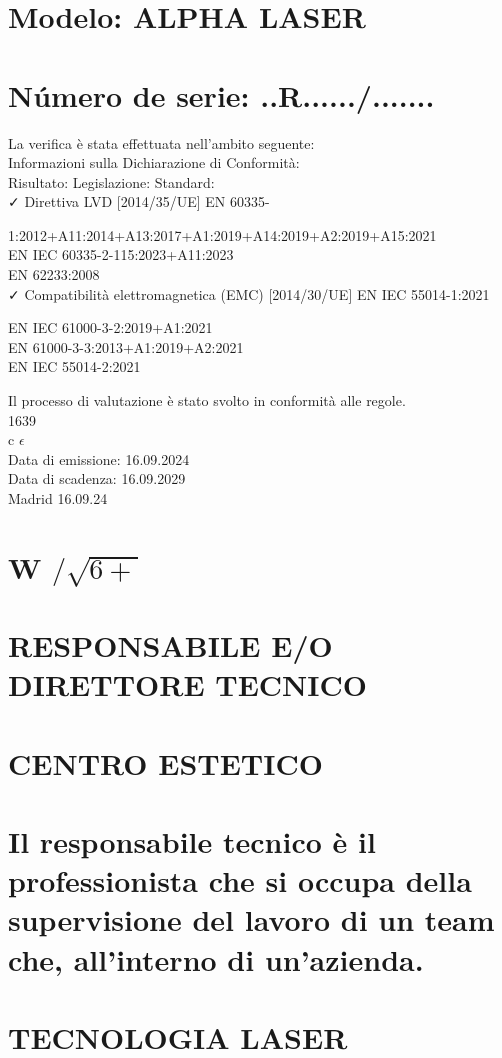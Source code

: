 \documentclass[10pt]{article}
\begin{document}
\section{Modelo: ALPHA LASER}
\section{Número de serie: ..R....../.......}
La verifica è stata effettuata nell'ambito seguente:\\
Informazioni sulla Dichiarazione di Conformità:\\
Risultato: Legislazione: Standard:\\[0pt]
✓ Direttiva LVD [2014/35/UE] EN 60335-

1:2012+A11:2014+A13:2017+A1:2019+A14:2019+A2:2019+A15:2021\\
EN IEC 60335-2-115:2023+A11:2023\\
EN 62233:2008\\[0pt]
✓ Compatibilità elettromagnetica (EMC) [2014/30/UE] EN IEC 55014-1:2021

EN IEC 61000-3-2:2019+A1:2021\\
EN 61000-3-3:2013+A1:2019+A2:2021\\
EN IEC 55014-2:2021

Il processo di valutazione è stato svolto in conformità alle regole.\\
1639\\
c $\epsilon$\\
Data di emissione: 16.09.2024\\
Data di scadenza: 16.09.2029\\
Madrid 16.09.24

\section*{W $/ \sqrt{6+}$ }
\section{RESPONSABILE E/O DIRETTORE TECNICO}
\section{CENTRO ESTETICO}
\section*{Il responsabile tecnico è il professionista che si occupa della supervisione del lavoro di un team che, all'interno di un'azienda. }
\section{TECNOLOGIA LASER}
\end{document}
